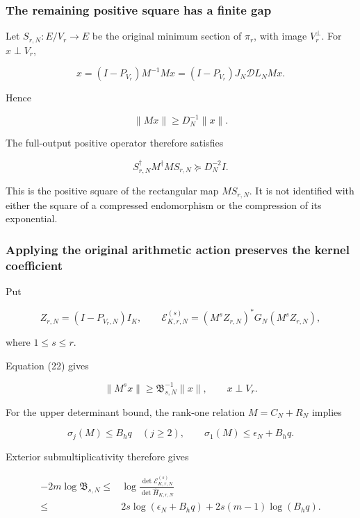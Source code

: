 \documentclass[11pt]{article}
\begin{document}
\subsubsection{The remaining positive square has a finite gap}\label{the-remaining-positive-square-has-a-finite-gap}

Let \(S_{r,N}:E/V_r\to E\) be the original minimum section of \(\pi_r\), with image \(V_r^\perp\). For \(x\perp V_r\),

\[
x=(I-P_{V_r})M^{-1}Mx
=(I-P_{V_r})J_N\mathscr DL_NMx.
\]

Hence

\[
\|Mx\|\ge D_N^{-1}\|x\|.
\]

The full-output positive operator therefore satisfies

\[
\boxed{
S_{r,N}^\dagger M^\dagger MS_{r,N}
\succeq D_N^{-2}I.
}
\tag{38}
\]

This is the positive square of the rectangular map \(MS_{r,N}\). It is not identified with either the square of a compressed endomorphism or the compression of its exponential.

\subsubsection{Applying the original arithmetic action preserves the kernel coefficient}\label{applying-the-original-arithmetic-action-preserves-the-kernel-coefficient}

Put

\[
Z_{r,N}=(I-P_{V_r,N})I_K,
\qquad
\mathcal E^{(s)}_{K,r,N}
=
(M^sZ_{r,N})^*G_N(M^sZ_{r,N}),
\]

where \(1\le s\le r\).

Equation (22) gives

\[
\|M^sx\|\ge\mathfrak B_{s,N}^{-1}\|x\|,
\qquad x\perp V_r.
\]

For the upper determinant bound, the rank-one relation \(M=C_N+R_N\) implies

\[
\sigma_j(M)\le B_hq\quad(j\ge2),\qquad
\sigma_1(M)\le\epsilon_N+B_hq.
\]

Exterior submultiplicativity therefore gives

\[
\boxed{
\begin{aligned}
-2m\log\mathfrak B_{s,N}
\le{}&
\log\frac{\det\mathcal E^{(s)}_{K,r,N}}
{\det\widehat H_{K,r,N}}\\
\le{}&
2s\log(\epsilon_N+B_hq)
+2s(m-1)\log(B_hq).
\end{aligned}
}
\tag{39}
\]
\end{document}
